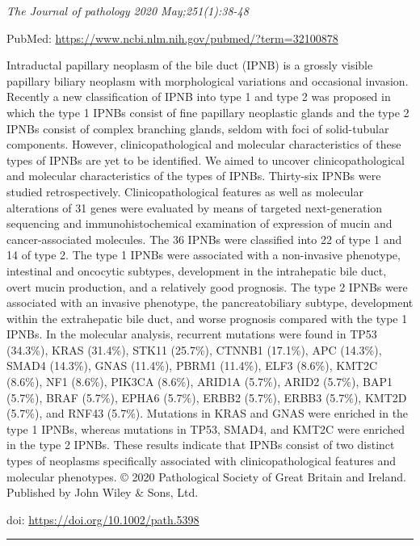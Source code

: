 \documentclass[
]{article}
\begin{document}
\emph{The Journal of pathology 2020 May;251(1):38-48}

PubMed: \url{https://www.ncbi.nlm.nih.gov/pubmed/?term=32100878}

Intraductal papillary neoplasm of the bile duct (IPNB) is a grossly
visible papillary biliary neoplasm with morphological variations and
occasional invasion. Recently a new classification of IPNB into type 1
and type 2 was proposed in which the type 1 IPNBs consist of fine
papillary neoplastic glands and the type 2 IPNBs consist of complex
branching glands, seldom with foci of solid-tubular components. However,
clinicopathological and molecular characteristics of these types of
IPNBs are yet to be identified. We aimed to uncover clinicopathological
and molecular characteristics of the types of IPNBs. Thirty-six IPNBs
were studied retrospectively. Clinicopathological features as well as
molecular alterations of 31 genes were evaluated by means of targeted
next-generation sequencing and immunohistochemical examination of
expression of mucin and cancer-associated molecules. The 36 IPNBs were
classified into 22 of type 1 and 14 of type 2. The type 1 IPNBs were
associated with a non-invasive phenotype, intestinal and oncocytic
subtypes, development in the intrahepatic bile duct, overt mucin
production, and a relatively good prognosis. The type 2 IPNBs were
associated with an invasive phenotype, the pancreatobiliary subtype,
development within the extrahepatic bile duct, and worse prognosis
compared with the type 1 IPNBs. In the molecular analysis, recurrent
mutations were found in TP53 (34.3\%), KRAS (31.4\%), STK11 (25.7\%),
CTNNB1 (17.1\%), APC (14.3\%), SMAD4 (14.3\%), GNAS (11.4\%), PBRM1
(11.4\%), ELF3 (8.6\%), KMT2C (8.6\%), NF1 (8.6\%), PIK3CA (8.6\%),
ARID1A (5.7\%), ARID2 (5.7\%), BAP1 (5.7\%), BRAF (5.7\%), EPHA6
(5.7\%), ERBB2 (5.7\%), ERBB3 (5.7\%), KMT2D (5.7\%), and RNF43 (5.7\%).
Mutations in KRAS and GNAS were enriched in the type 1 IPNBs, whereas
mutations in TP53, SMAD4, and KMT2C were enriched in the type 2 IPNBs.
These results indicate that IPNBs consist of two distinct types of
neoplasms specifically associated with clinicopathological features and
molecular phenotypes. © 2020 Pathological Society of Great Britain and
Ireland. Published by John Wiley \& Sons, Ltd.

doi: \url{https://doi.org/10.1002/path.5398}

\begin{center}\rule{0.5\linewidth}{0.5pt}\end{center}
\end{document}
